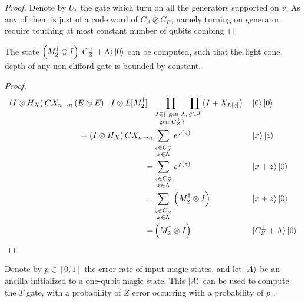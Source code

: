 \documentclass[manuscript,screen,review]{acmart}
\begin{document}
\begin{proof}
  Denote by $U_{v}$ the gate which turn on all the generators supported on $v$.
  As any of them is just of a code word of $C_{A}\otimes C_{B}$, namely turning
  on generator require touching at most constant number of qubits combing
\end{proof}

\begin{claim}
  \label{claim:lowlightcone}
  The state $\left(M_{2}^{\dagger}\otimes I\right)\ket{ C_{Z}^{\perp} +
  \Lambda   }\ket{0}$ can be computed, such that the light cone depth of any
  non-clifford gate is bounded by constant.
\end{claim}
\begin{proof}
  \begin{align*}
    \left( I \otimes H_{X} \right) CX_{n\rightarrow n} \left(E \otimes E
    \right) \ \ I \otimes L[M_{2}^{\dagger}] \ \ & \prod_{\substack{ J\in \{
    \text{ gen }\Lambda,\\ \text{ gen } C_{Z}^{\perp} \}}} \prod_{g \in J}
    \left(
    I +  X_{L[g]} \right) && \ket{0} \ket{0} \\
    = \left( I \otimes H_{X}   \right) CX_{n\rightarrow n} & \sum_{\substack{ z
    \in C_{Z}^\perp \\  x\in \Lambda}}  e^{\varphi(z)} && \ket{x}\ket{z} \\
    = & \sum_{\substack{ z \in C_{Z}^\perp \\  x\in \Lambda}}   e^{\varphi(z)}
    && \ket{x+z}\ket{0} \\
    = & \sum_{\substack{ z \in C_{Z}^\perp \\  x\in \Lambda}}
    \left(M_{2}^{\dagger}\otimes I\right) && \ket{x+z}\ket{0} \\
    = & \left(M_{2}^{\dagger}\otimes I\right) && \ket{ C_{Z}^{\perp} +
    \Lambda   }\ket{0}
  \end{align*}
\end{proof}
Denote by $p \in [0,1]$ the error rate of input magic states, and let $\ket{A}$
be an ancilla initialized to a one-qubit magic state. This $\ket{A}$ can be
used to compute the $T$ gate, with a probability of $Z$ error occurring with a
probability of $p$ \cite{bravyi2012magic}.
\end{document}
